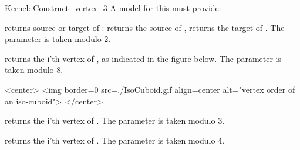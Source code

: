 \begin{ccRefFunctionObjectConcept}{Kernel::Construct_vertex_3}
A model for this must provide:


 {returns source or target of : \ccVar{}
  returns the source of , \ccVar{} returns the target
  of . The parameter  is taken modulo 2. }

 {returns the i'th vertex of
  , as indicated in the figure below. The parameter  is
  taken modulo 8. }

\begin{ccHtmlOnly}
<center>
<img border=0 src=./IsoCuboid.gif align=center alt="vertex order of an iso-cuboid">
</center>
\end{ccHtmlOnly} 

 {returns the i'th vertex of . The parameter
   is taken modulo 3.}

 {returns the i'th vertex of
  . The parameter  is taken modulo 4.}

\ccIsModel{}

\end{ccRefFunctionObjectConcept}
